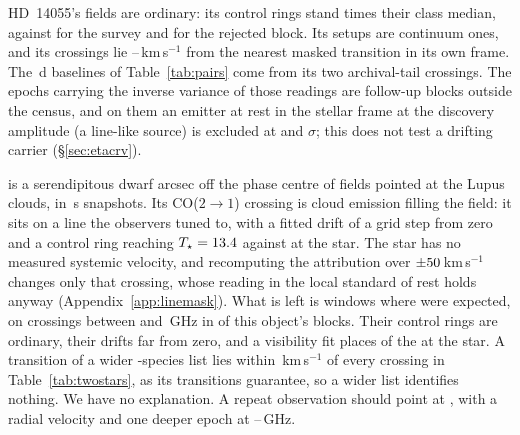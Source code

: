 HD~14055's fields are ordinary: its control rings stand \TwRingQHD{} times
their class median, against \TwRingQSurv{} for the survey and \TwBlockQMax{}
for the rejected block. Its setups are continuum ones, and its crossings lie
\TwHDMaskLo--\TwHDMaskHi\,km\,s$^{-1}$ from the nearest masked transition in
its own frame. The \TwPairSpanD\,d baselines of Table~\ref{tab:pairs} come from its two
archival-tail crossings. The \TwHDNDeep{} epochs carrying the inverse variance
of those readings are follow-up blocks outside the census, and on them an
emitter at rest in the
stellar frame at the discovery amplitude (a line-like source) is excluded at
\TwHDExclA{} and \TwHDExclB$\sigma$; this does not test a drifting carrier
(\S\ref{sec:etacrv}).

\BkAlmaName{} is a serendipitous dwarf \TwPbJx{} arcsec off the phase centre
of fields pointed at the Lupus clouds, in \TwOnSrcJx\,s snapshots. Its
CO($2\to1$) crossing is cloud emission filling the field: it sits on a line
the observers tuned to, with a fitted drift \TwStepMin{} of a grid step from
zero and a control ring reaching $T_\star=13.4$ against
\TwTStarCtrlJx{} at the star. The star has no measured systemic velocity, and
recomputing the attribution over $\pm50$\,km\,s$^{-1}$ changes
only that crossing, whose reading in the local standard of rest holds anyway
(Appendix~\ref{app:linemask}). What is left is
\TwNExcJxWord{} windows where \TwExpJx{} were expected, on
\TwJxNCrossExcWord{} crossings between \TwJxExcBandLo{} and
\TwJxExcBandHi\,GHz in \TwJxNBlockExcWord{} of this object's
\TwJxNBlockWord{} blocks. Their control rings are ordinary, their drifts far
from zero, and a visibility fit places \TwJxNLocalExcWord{} of the
\TwJxNCrossExcWord{} at the star. A transition of a wider \TwWideNSpecies-species list lies within
\TwWideDvMax\,km\,s$^{-1}$ of every crossing in Table~\ref{tab:twostars}, as
its \TwWideNTrans{} transitions guarantee, so a wider list identifies nothing.
We have no explanation. A repeat observation should point at \BkAlmaName,
with a radial velocity and one deeper epoch at
\TwJxExcBandLo--\TwJxExcBandHi\,GHz.

\begin{table}
\centering
\caption{\textbf{Every crossing toward HD~14055 and \BkAlmaName.} Rates are
in the observatory frame; $\ge$ and $\le$ mark a fit on the grid's outermost
trial.}
\label{tab:twostars}
\scriptsize

\end{table}

